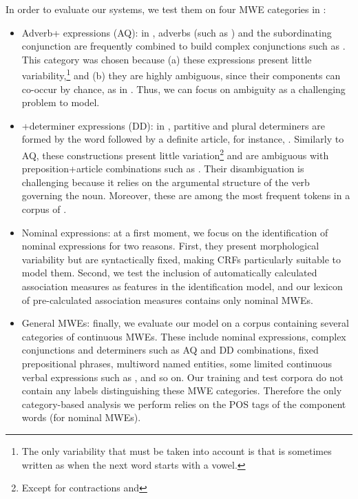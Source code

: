 \documentclass[output=paper,modfonts]{langscibook}
\begin{document}
In order to evaluate our systems, we test them on four MWE categories in :

\begin{itemize}
\item Adverb+ expressions (AQ): in , adverbs (such as ) and the subordinating conjunction  are frequently combined to build complex conjunctions such as . This category was chosen because (a) these expressions present little variability,\footnote{The only variability that must be taken into account is that  is sometimes written as  when the next word starts with a vowel.} and (b) they are highly ambiguous, since their components can co-occur by chance, as in . Thus, we can focus on ambiguity as a challenging problem to model.
\item {}+determiner expressions (DD): in , partitive and plural determiners are formed by the word  followed by a definite article, for instance, . Similarly to AQ, these constructions present little variation\footnote{Except for contractions  and } and are ambiguous with preposition+article combinations such as . Their disambiguation is challenging because it relies on the argumental structure of the verb governing the noun. Moreover, these are among the most frequent tokens in a corpus of  \citep{nasr:acl:2015}.
\item Nominal expressions: at a first moment, we focus on the identification of nominal expressions for two reasons. First, they present morphological variability but are syntactically fixed, making CRFs particularly suitable to model them. Second, we test the inclusion of automatically calculated association measures as features in the identification model, and our lexicon of pre-calculated association measures contains only nominal MWEs.
\item General MWEs: finally, we evaluate our model on a corpus containing several categories of continuous MWEs. These include nominal expressions, complex conjunctions and determiners such as AQ and DD combinations, fixed prepositional phrases, multiword named entities, some limited continuous verbal expressions such as , and so on. Our training and test corpora do not contain any labels distinguishing these MWE categories. Therefore the only category-based analysis we perform relies on the POS tags of the component words (for nominal MWEs).
\end{itemize}
\end{document}
